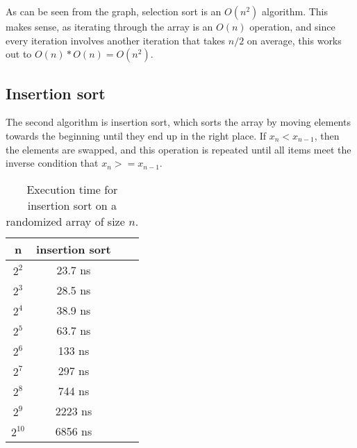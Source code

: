 \documentclass[a4paper,11pt]{article}
\begin{document}
\begin{table}[H]
\centering
{}
\end{table}

As can be seen from the graph, selection sort is an $O(n^2)$ algorithm. This makes sense, as iterating through the array is an $O(n)$ operation, and since every iteration involves another iteration that takes $n/2$ on average, this works out to $O(n) * O(n) = O(n^2)$.

\subsection*{Insertion sort}

The second algorithm is insertion sort, which sorts the array by moving elements towards the beginning until they end up in the right place. If $x_n < x_{n - 1}$, then the elements are swapped, and this operation is repeated until all items meet the inverse condition that $x_n >= x_{n - 1}$.

\begin{table}[H]
\centering
\begin{tabular}{|c|c|c|c|}
\hline
\textbf{n} & \textbf{insertion sort} \\
\hline
	$2^{2}$ & 23.7 ns \\
	$2^{3}$ & 28.5 ns \\
	$2^{4}$ & 38.9 ns \\
	$2^{5}$ & 63.7 ns \\
	$2^{6}$ & 133 ns \\
	$2^{7}$ & 297 ns \\
	$2^{8}$ & 744 ns \\
	$2^{9}$ & 2223 ns \\
	$2^{10}$ & 6856 ns \\
\hline
\end{tabular}
\caption{Execution time for insertion sort on a randomized array of size $n$.}
\label{tab:table2}
\end{table}

\begin{table}[H]
\centering
{}
\end{table}
\end{document}
